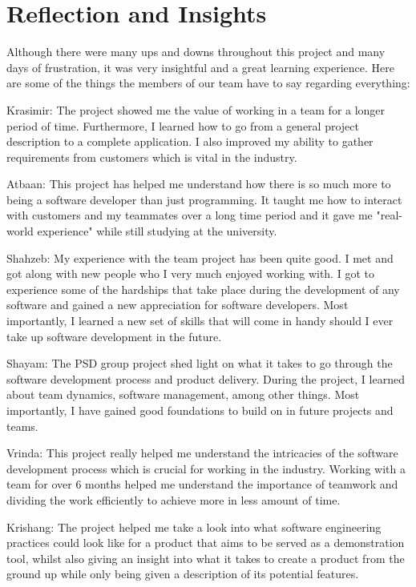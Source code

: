 \documentclass{l3proj}
\begin{document}
\section{Reflection and Insights}

Although there were many ups and downs throughout this project and many days of frustration, it was very insightful and a great learning experience. Here are some of the things the members of our team have to say regarding everything:

Krasimir: The project showed me the value of working in a team for a longer period of time. Furthermore, I learned how to go from a general project description to a complete application. I also improved my ability to gather requirements from customers which is vital in the industry.

Atbaan: This project has helped me understand how there is so much more to being a software developer than just programming. It taught me how to interact with customers and my teammates over a long time period and it gave me "real-world experience" while still studying at the university.

Shahzeb: My experience with the team project has been quite good. I met and got along with new people who I very much enjoyed working with. I got to experience some of the hardships that take place during the development of any software and gained a new appreciation for software developers. Most importantly, I learned a new set of skills that will come in handy should I ever take up software development in the future.

Shayam: The PSD group project shed light on what it takes to go through the software development process and product delivery. During the project, I learned about team dynamics, software management, among other things. Most importantly, I have gained good foundations to build on in future projects and teams.

Vrinda: This project really helped me understand the intricacies of the software development process which is crucial for working in the industry. Working with a team for over 6 months helped me understand the importance of teamwork and dividing the work efficiently to achieve more in less amount of time.

Krishang: The project helped me take a look into what software engineering practices could look like for a product that aims to be served as a demonstration tool, whilst also giving an insight into what it takes to create a product from the ground up while only being given a description of its potential features.
\end{document}
